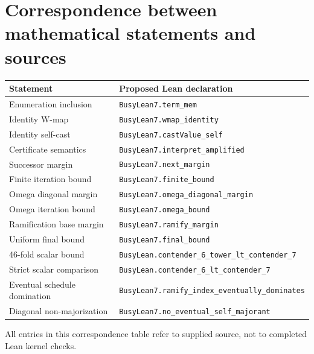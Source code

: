\documentclass[11pt,letterpaper]{article}
\theoremstyle{definition}
\newcommand{\code}[1]{\texttt{#1}}
\begin{document}


\section{Correspondence between mathematical statements and sources}
\label{app:map}

\begin{longtable}{@{}p{}p{}@{}}
\toprule
Statement & Proposed Lean declaration\\
\midrule
\endhead
Enumeration inclusion & \code{BusyLean7.term\_mem}\\
Identity W-map & \code{BusyLean7.wmap\_identity}\\
Identity self-cast & \code{BusyLean7.castValue\_self}\\
Certificate semantics & \code{BusyLean7.interpret\_amplified}\\
Successor margin & \code{BusyLean7.next\_margin}\\
Finite iteration bound & \code{BusyLean7.finite\_bound}\\
Omega diagonal margin & \code{BusyLean7.omega\_diagonal\_margin}\\
Omega iteration bound & \code{BusyLean7.omega\_bound}\\
Ramification base margin & \code{BusyLean7.ramify\_margin}\\
Uniform final bound & \code{BusyLean7.final\_bound}\\
46-fold scalar bound & \code{BusyLean.contender\_6\_tower\_lt\_contender\_7}\\
Strict scalar comparison & \code{BusyLean.contender\_6\_lt\_contender\_7}\\
Eventual schedule domination & \code{BusyLean7.ramify\_index\_eventually\_dominates}\\
Diagonal non-majorization & \code{BusyLean7.no\_eventual\_self\_majorant}\\
\bottomrule
\end{longtable}

\noindent All entries in this correspondence table refer to supplied source,
not to completed Lean kernel checks.
\end{document}
